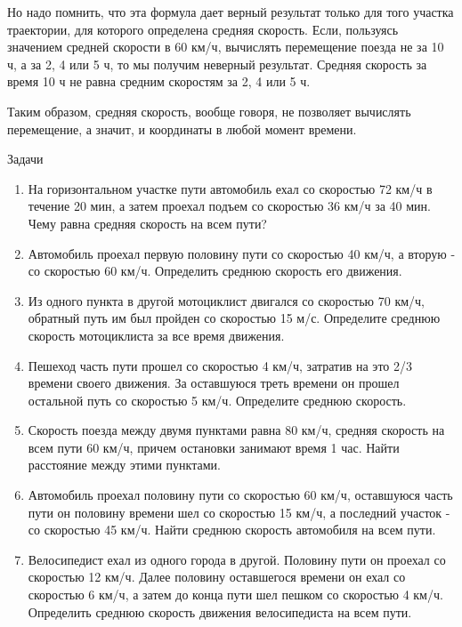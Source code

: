 \documentclass[a5paper, 10pt]{diss_4}
\renewcommand{\'}{\,'}
\begin{document}
 Но надо помнить, что эта формула дает верный результат только для того участка
траектории, для которого определена средняя скорость. Если, пользуясь значением
средней скорости в 60 км/ч, вычислять перемещение поезда не за 10 ч, а за 2, 4
или 5 ч, то мы получим неверный результат. Средняя скорость за время 10 ч не
равна средним скоростям за 2, 4 или 5 ч.

Таким образом, средняя скорость, вообще говоря, не позволяет вычислять
перемещение, а значит, и координаты в любой момент времени.

\begin{center}
   Задачи
\end{center}
\begin{enumerate}
\item На горизонтальном участке пути автомобиль ехал со скоростью 72 км/ч в
течение 20 мин, а затем проехал подъем со скоростью 36 км/ч за 40 мин. Чему
равна средняя скорость на всем пути?

\item Автомобиль проехал первую половину пути со скоростью 40 км/ч, а вторую
- со скоростью 60 км/ч. Определить среднюю скорость его движения.

\item Из одного пункта в другой мотоциклист двигался со скоростью 70 км/ч,
обратный путь им был пройден со скоростью 15 м/с. Определите среднюю скорость
мотоциклиста за все время движения.

\item Пешеход часть пути прошел со скоростью 4 км/ч, затратив на это 2/3 времени
 своего движения. За оставшуюся треть времени он прошел остальной путь со
  скоростью 5 км/ч. Определите среднюю скорость.

\item Скорость поезда между двумя пунктами равна 80 км/ч, средняя скорость на
всем пути 60 км/ч, причем остановки занимают время 1 час. Найти расстояние между
 этими пунктами.

\item Автомобиль проехал половину пути со скоростью 60 км/ч, оставшуюся часть
пути он половину времени шел со скоростью 15 км/ч, а последний участок - со
скоростью 45 км/ч. Найти среднюю скорость автомобиля на всем пути.

\item Велосипедист ехал из одного города в другой. Половину пути он проехал со
скоростью 12 км/ч. Далее половину оставшегося времени он ехал со скоростью
6 км/ч, а затем до конца пути шел пешком со скоростью 4 км/ч. Определить среднюю
скорость движения велосипедиста на всем пути.
\end{enumerate}
\end{document}
